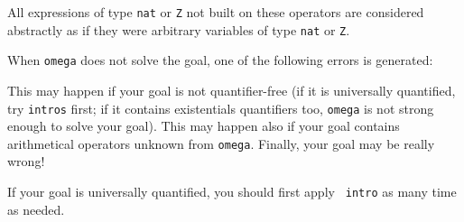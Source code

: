 All expressions of type \verb=nat= or \verb=Z= not built on these
operators are considered abstractly as if they
were arbitrary variables of type \verb=nat= or \verb=Z=.

\label{errors}

When {\tt omega} does not solve the goal, one of the following errors
is generated:

\begin{ErrMsgs}

\item {}

  This may happen if your goal is not quantifier-free (if it is
  universally quantified, try {\tt intros} first; if it contains
  existentials quantifiers too, {\tt omega} is not strong enough to solve your
  goal). This may happen also if your goal contains arithmetical
  operators unknown from {\tt omega}. Finally, your goal may be really
  wrong!

\item {}
  
  If your goal is universally quantified, you should first apply {\tt
    intro} as many time as needed.

\item {}

\item {}
  
\item {}

\item {}

\item {}

\item {}

\end{ErrMsgs}



